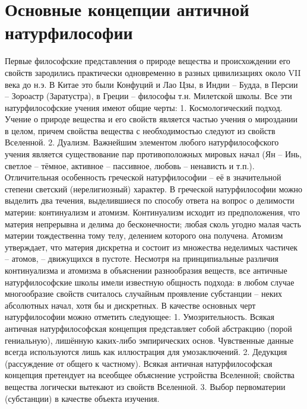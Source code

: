 \documentclass[12pt]{article}
\begin{document}
\section{Основные концепции античной натурфилософии}
Первые философские представления о природе вещества и происхождении его свойств зародились практически
одновременно в разных цивилизациях около VII века до н.э. В Китае это были Конфуций и Лао Цзы, в Индии –
Будда, в Персии – Зороастр (Заратустра), в Греции – философы т.н. Милетской школы.
Все эти натурфилософские учения имеют общие черты:
1. Космологический подход. Учение о природе вещества и его свойств является частью учения о мироздании в
целом, причем свойства вещества с необходимостью следуют из свойств Вселенной.
2.   Дуализм.  Важнейшим  элементом  любого  натурфилософского  учения  является  существование  пар
противоположных мировых начал (Ян – Инь, светлое – тёмное, активное – пассивное, любовь – ненависть и
т.п.).
Отличительная особенность греческой натурфилософии – её в значительной степени светский (нерелигиозный)
характер. В греческой натурфилософии можно выделить два течения, выделившиеся по способу ответа на
вопрос о делимости материи: континуализм и атомизм.
Континуализм исходит из предположения, что материя непрерывна и делима до бесконечности; любая сколь
угодно малая часть материи тождественна тому телу, делением которого она получена.
Атомизм  утверждает,  что  материя  дискретна  и  состоит  из   множества  неделимых  частичек  –   атомов,  –
движущихся в пустоте.
Несмотря на принципиальные различия континуализма и атомизма в объяснении разнообразия веществ,  все
античные  натурфилософские  школы  имели  известную  общность  подхода:  в  любом  случае  многообразие
свойств считалось случайным проявление субстанции – неких абсолютных начал, хотя бы и дискретных.
В качестве основных черт натурфилософии можно отметить следующее:
1.  Умозрительность. Всякая античная натурфилософская концепция представляет собой абстракцию (порой
гениальную), лишённую каких-либо эмпирических основ. Чувственные данные всегда используются лишь как
иллюстрация для умозаключений.
2. Дедукция (рассуждение от общего к частному). Всякая античная натурфилософская концепция претендует на
всеобщее объяснение устройства Вселенной; свойства вещества логически вытекают из свойств Вселенной.
3. Выбор первоматерии (субстанции) в качестве объекта изучения.

\newpage
\end{document}
